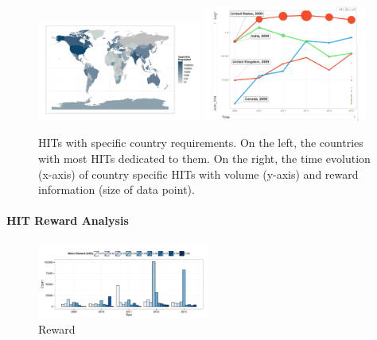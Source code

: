 \begin{figure}[htbp]
	\centering
		\includegraphics[width=0.48\textwidth]{figures/map}
		\includegraphics[width=0.48\textwidth]{figures/countriesTime}
	\caption{HITs with specific country requirements. On the left, the countries with most HITs dedicated to them. On the right, the time evolution (x-axis) of country specific HITs with volume (y-axis) and reward information (size of data point).}
	\label{fig:country}
\end{figure}



\paragraph{HIT Reward Analysis}
\begin{figure}[htbp]
	\centering
		\includegraphics[width=0.5\textwidth]{figures/reward_year}
	\caption{Reward }
	\label{fig:reward_year}
\end{figure}

